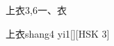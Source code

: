 \begin{entry}{上衣}{3,6}{⼀、⾐}
  \begin{phonetics}{上衣}{shang4 yi1}[][HSK 3]
  \end{phonetics}
\end{entry}
